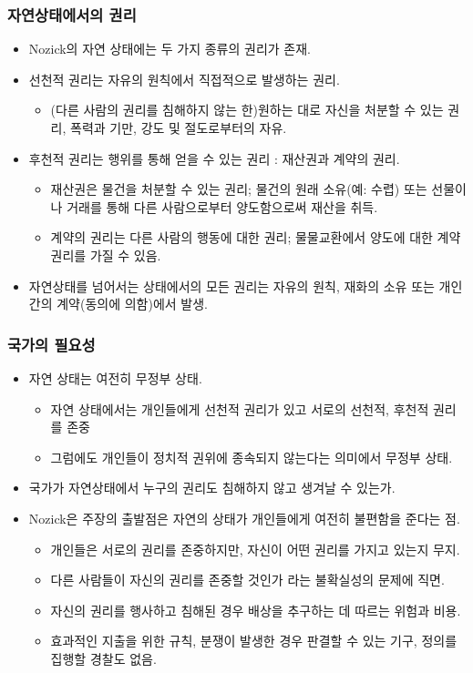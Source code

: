 \documentclass[aspectratio=169,xcolor=dvipsnames,handout]{beamer}
\begin{document}
\begin{frame}[<+->]
\frametitle{자연상태에서의 권리}
    \begin{itemize}
        \item Nozick의 자연 상태에는 두 가지 종류의 권리가 존재.
        \item 선천적 권리는 자유의 원칙에서 직접적으로 발생하는 권리.
        \begin{itemize}
           \item  (다른 사람의 권리를 침해하지 않는 한)원하는 대로 자신을 처분할 수 있는 권리, 폭력과 기만, 강도 및 절도로부터의 자유. 
        \end{itemize}
        \item 후천적 권리는 행위를 통해 얻을 수 있는 권리 : 재산권과 계약의 권리.
        \begin{itemize}
           \item  재산권은 물건을 처분할 수 있는 권리; 물건의 원래 소유(예: 수렵) 또는 선물이나 거래를 통해 다른 사람으로부터 양도함으로써 재산을 취득.
           \item  계약의 권리는 다른 사람의 행동에 대한 권리; 물물교환에서 양도에 대한 계약 권리를 가질 수 있음.
        \end{itemize}
       \item  자연상태를 넘어서는 상태에서의 모든 권리는 자유의 원칙, 재화의 소유 또는 개인 간의 계약(동의에 의함)에서 발생.
    \end{itemize}
\end{frame}

\begin{frame}[<+->]
\frametitle{국가의 필요성}
    \begin{itemize}
       \item 자연 상태는 여전히 무정부 상태.
        \begin{itemize}
           \item 자연 상태에서는 개인들에게 선천적 권리가 있고 서로의 선천적, 후천적 권리를 존중 
           \item 그럼에도 개인들이 정치적 권위에 종속되지 않는다는 의미에서 무정부 상태.
        \end{itemize}
       \item  국가가 자연상태에서 누구의 권리도 침해하지 않고 생겨날 수 있는가.
       \item  Nozick은 주장의 출발점은 자연의 상태가 개인들에게 여전히 불편함을 준다는 점.
       \begin{itemize}
           \item 개인들은 서로의 권리를 존중하지만, 자신이 어떤 권리를 가지고 있는지 무지.
           \item 다른 사람들이 자신의 권리를 존중할 것인가 라는 불확실성의 문제에 직면. 
           \item 자신의 권리를 행사하고 침해된 경우 배상을 추구하는 데 따르는 위험과 비용.
           \item 효과적인 지출을 위한 규칙, 분쟁이 발생한 경우 판결할 수 있는 기구, 정의를 집행할 경찰도 없음.
       \end{itemize}
    \end{itemize}
\end{frame}
\end{document}
